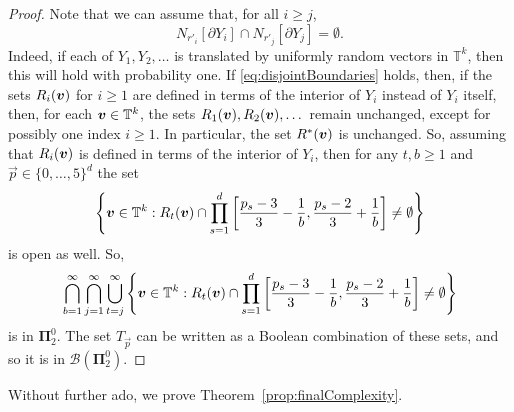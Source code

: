 \documentclass[12pt,a4paper]{amsart}
\numberwithin{equation}{section}
\newcommand{\bPi}{\boldsymbol{\Pi}}
\newcommand{\bB}{\boldsymbol{\mathcal{B}}}
\theoremstyle{definition}
\begin{document}
\begin{proof}
Note that we can assume that, for all $i\geq j$, 
\begin{equation}\label{eq:disjointBoundaries}N_{r'_i}[\partial Y_i]\cap N_{r'_j}[\partial Y_j]=\emptyset.\end{equation}
Indeed, if each of $Y_1,Y_2,\dots$ is translated by uniformly random vectors in $\mathbb{T}^k$, then this will hold with probability one. If \eqref{eq:disjointBoundaries} holds, then, if the sets $R_i(\boldsymbol{v})$ for $i\geq1$ are defined in terms of the interior of $Y_i$ instead of $Y_i$ itself, then, for each $\boldsymbol{v}\in \mathbb{T}^k$, the sets $R_1(\boldsymbol{v}),R_2(\boldsymbol{v}),\dots$ remain unchanged, except for possibly one index $i\geq1$. In particular, the set $R^*(\boldsymbol{v})$ is unchanged. So, assuming that $R_i(\boldsymbol{v})$ is defined in terms of the interior of $Y_i$, then for any $t,b\geq1$ and $\vec{p}\in\{0,\dots,5\}^d$ the set
\[\left\{\boldsymbol{v}\in\mathbb{T}^k: R_t(\boldsymbol{v})\cap \prod_{s=1}^d\left[\frac{p_s-3}{3}-\frac{1}{b},\frac{p_s-2}{3}+\frac{1}{b}\right]\neq\emptyset\right\}\]
is open as well. So,  
\[\bigcap_{b=1}^\infty\bigcap_{j=1}^\infty\bigcup_{t=j}^\infty\left\{\boldsymbol{v}\in\mathbb{T}^k: R_t(\boldsymbol{v})\cap \prod_{s=1}^d\left[\frac{p_s-3}{3}-\frac{1}{b},\frac{p_s-2}{3}+\frac{1}{b}\right]\neq\emptyset\right\}\]
is in $\bPi_2^0$. The set $T_{\vec{p}}$ can be written as a Boolean combination of these sets, and so it is in $\bB(\bPi_2^0)$. 
\end{proof}

Without further ado, we prove Theorem~\ref{prop:finalComplexity}. 
\end{document}
